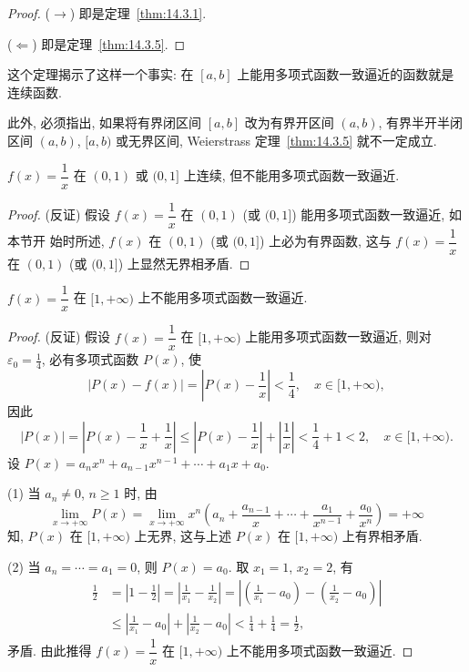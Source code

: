 \begin{proof}
($\rightarrow$) 即是定理~\ref{thm:14.3.1}.

($\Leftarrow$) 即是定理~\ref{thm:14.3.5}.
\end{proof}

这个定理揭示了这样一个事实: 在 $[a,b]$ 上能用多项式函数一致逼近的函数就是连续函数.

此外, 必须指出, 如果将有界闭区间 $[a,b]$ 改为有界开区间 $(a,b)$, 有界半开半闭区间 $(a,b)$, $[a,b)$ 或无界区间, Weierstrass 定理~\ref{thm:14.3.5} 就不一定成立.

\begin{example}\label{ex:14.3.1}
$f(x)=\dfrac{1}{x}$ 在 $(0,1)$ 或 $(0,1]$ 上连续, 但不能用多项式函数一致逼近.
\end{example}

\begin{proof}
(反证) 假设 $f(x)=\dfrac{1}{x}$ 在 $(0,1)$ (或 $(0,1]$) 能用多项式函数一致逼近, 如本节开
始时所述, $f(x)$ 在 $(0,1)$ (或 $(0,1]$) 上必为有界函数, 这与 $f(x)=\dfrac{1}{x}$ 在 $(0,1)$ (或 $(0,1]$) 上显然无界相矛盾.
\end{proof}

\begin{example}\label{ex:14.3.2}
$f(x)=\dfrac{1}{x}$ 在 $[1,+\infty)$ 上不能用多项式函数一致逼近.
\end{example}

\begin{proof}
(反证) 假设 $f(x)=\dfrac{1}{x}$ 在 $[1,+\infty)$ 上能用多项式函数一致逼近, 则对 $\varepsilon_{0}=\frac{1}{4}$, 必有多项式函数 $P(x)$, 使
\[
  |P(x)-f(x)|=\left|P(x)-\frac{1}{x}\right|<\frac{1}{4},\quad x\in[1,+\infty),
\]
因此
\[
  |P(x)|=\left|P(x)-\frac{1}{x}+\frac{1}{x}\right|\leqslant\left|P(x)-\frac{1}{x}\right|+\left|\frac{1}{x}\right|<\frac{1}{4}+1<2,\quad x\in[1,+\infty).
\]
设 $P(x)=a_{n}x^{n}+a_{n-1}x^{n-1}+\cdots+a_{1}x+a_{0}$.

(1) 当 $a_{n}\neq0$, $n\geqslant1$ 时, 由
\[
  \lim_{x\to+\infty}P(x)=\lim_{x\to+\infty}x^{n}\left(a_{n}+\frac{a_{n-1}}{x}+\cdots+\frac{a_{1}}{x^{n-1}}+\frac{a_{0}}{x^{n}}\right)=+\infty
\]
知, $P(x)$ 在 $[1,+\infty)$ 上无界, 这与上述 $P(x)$ 在 $[1,+\infty)$ 上有界相矛盾.

(2) 当 $a_{n}=\cdots=a_{1}=0$, 则 $P(x)=a_{0}$. 取 $x_{1}=1$, $x_{2}=2$, 有
\[
  \begin{aligned}
    \frac{1}{2}&=\left|1-\frac{1}{2}\right|=\left|\frac{1}{x_{1}}-\frac{1}{x_{2}}\right|=\left|\left(\frac{1}{x_{1}}-a_{0}\right)-\left(\frac{1}{x_{2}}-a_{0}\right)\right|\\
    &\leqslant\left|\frac{1}{x_{1}}-a_{0}\right|+\left|\frac{1}{x_{2}}-a_{0}\right|<\frac{1}{4}+\frac{1}{4}=\frac{1}{2},
  \end{aligned}
\]
矛盾. 由此推得 $f(x)=\dfrac{1}{x}$ 在 $[1,+\infty)$ 上不能用多项式函数一致逼近.
\qedhere
\end{proof}

